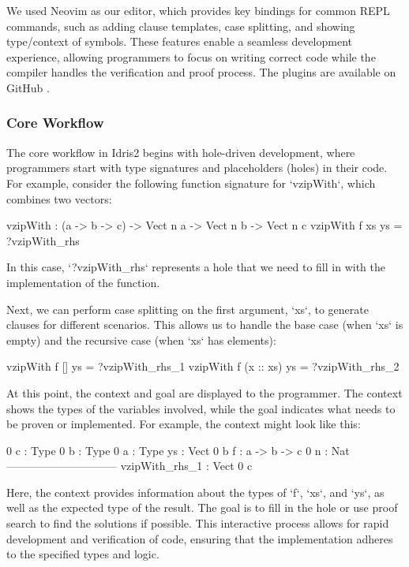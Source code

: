 \documentclass[]{rptuseminar}
\begin{document}
We used Neovim as our editor, which provides key bindings for common REPL commands, such as adding clause templates, case splitting, and showing type/context of symbols. These features enable a seamless development experience, allowing programmers to focus on writing correct code while the compiler handles the verification and proof process. The plugins are available on GitHub \cite{repo-key}.

\subsubsection{Core Workflow}
The core workflow in Idris2 begins with hole-driven development, where programmers start with type signatures and placeholders (holes) in their code. For example, consider the following function signature for `vzipWith`, which combines two vectors:

\begin{idris}
vzipWith : (a -> b -> c) -> Vect n a -> Vect n b -> Vect n c
vzipWith f xs ys = ?vzipWith_rhs
\end{idris}

In this case, `?vzipWith\_rhs` represents a hole that we need to fill in with the implementation of the function.

Next, we can perform case splitting on the first argument, `xs`, to generate clauses for different scenarios. This allows us to handle the base case (when `xs` is empty) and the recursive case (when `xs` has elements):

\begin{idris}  
vzipWith f [] ys = ?vzipWith_rhs_1
vzipWith f (x :: xs) ys = ?vzipWith_rhs_2
\end{idris}

At this point, the context and goal are displayed to the programmer. The context shows the types of the variables involved, while the goal indicates what needs to be proven or implemented. For example, the context might look like this:

\begin{idris}
 0 c : Type
 0 b : Type
 0 a : Type
   ys : Vect 0 b
   f : a -> b -> c
 0 n : Nat
------------------------------
vzipWith_rhs_1 : Vect 0 c
\end{idris}

Here, the context provides information about the types of `f`, `xs`, and `ys`, as well as the expected type of the result. The goal is to fill in the hole or use proof search to find the solutions if possible. This interactive process allows for rapid development and verification of code, ensuring that the implementation adheres to the specified types and logic.
\end{document}
